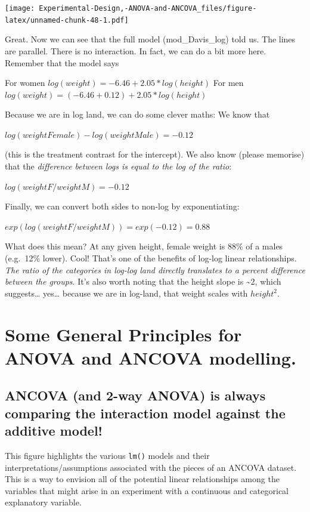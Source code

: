 \documentclass[
]{book}
\begin{document}
\texttt{[image: Experimental-Design,-ANOVA-and-ANCOVA\_files/figure-latex/unnamed-chunk-48-1.pdf]}

Great. Now we can see that the full model (mod\_Davis\_log) told us. The lines are parallel. There is no interaction. In fact, we can do a bit more here. Remember that the model says

For women \(log(weight)= -6.46 + 2.05 * log(height)\)
For men \(log(weight)= (-6.46 + 0.12) + 2.05 * log(height)\)

Because we are in log land, we can do some clever maths: We know that

\(log(weight Female) - log(weight Male) = - 0.12\)

(this is the treatment contrast for the intercept). We also know (please memorise) that the \emph{difference between logs is equal to the log of the ratio}:

\(log(weightF/weightM) = -0.12\)

Finally, we can convert both sides to non-log by exponentiating:

\(exp(log(weightF/weightM)) = exp(-0.12) = 0.88\)

What does this mean? At any given height, female weight is 88\% of a males (e.g.~12\% lower). Cool! That's one of the benefits of log-log linear relationships. \emph{The ratio of the categories in log-log land directly translates to a percent difference between the groups}. It's also worth noting that the height slope is \textasciitilde2, which suggests\ldots{} yes\ldots{} because we are in log-land, that weight scales with \(height^2\).

\hypertarget{some-general-principles-for-anova-and-ancova-modelling.}{%
\section{Some General Principles for ANOVA and ANCOVA modelling.}\label{some-general-principles-for-anova-and-ancova-modelling.}}

\hypertarget{ancova-and-2-way-anova-is-always-comparing-the-interaction-model-against-the-additive-model}{%
\subsection{ANCOVA (and 2-way ANOVA) is always comparing the interaction model against the additive model!}\label{ancova-and-2-way-anova-is-always-comparing-the-interaction-model-against-the-additive-model}}

This figure highlights the various \texttt{lm()} models and their interpretations/assumptions associated with the pieces of an ANCOVA dataset. This is a way to envision all of the potential linear relationships among the variables that might arise in an experiment with a continuous and categorical explanatory variable.
\end{document}
